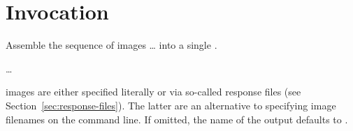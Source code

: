 

\chapter[Invocation]{Invocation
  \label{sec:invocation}
  }


\noindent Assemble the sequence of images \dots{} into
a single .

\smallskip

\code{\app} 
 \dots

\smallskip

\noindent {} images are either specified
literally  or via
so-called response files (see
Section~\ref{sec:response-files}).  The latter are an alternative to
specifying image filenames on the command line.  If omitted, the name
of the output  defaults to
.







